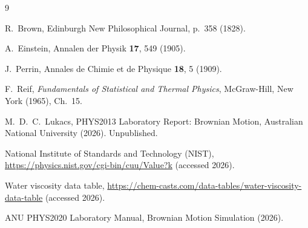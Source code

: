 \documentclass[prb,twocolumn]{revtex4-1}
\begin{document}
\begin{thebibliography}{9}

R.\ Brown, Edinburgh New Philosophical Journal, p.\ 358 (1828).

A.\ Einstein, Annalen der Physik \textbf{17}, 549 (1905).

J.\ Perrin, Annales de Chimie et de Physique \textbf{18}, 5 (1909).

F.\ Reif, \textit{Fundamentals of Statistical and Thermal Physics}, McGraw-Hill, New York (1965), Ch.~15.

M.\ D.\ C.\ Lukacs, PHYS2013 Laboratory Report: Brownian Motion, Australian National University (2026). Unpublished.

National Institute of Standards and Technology (NIST),
\url{https://physics.nist.gov/cgi-bin/cuu/Value?k} (accessed 2026).

Water viscosity data table,
\url{https://chem-casts.com/data-tables/water-viscosity-data-table} (accessed 2026).

ANU PHYS2020 Laboratory Manual, Brownian Motion Simulation (2026).

\end{thebibliography}
\end{document}

